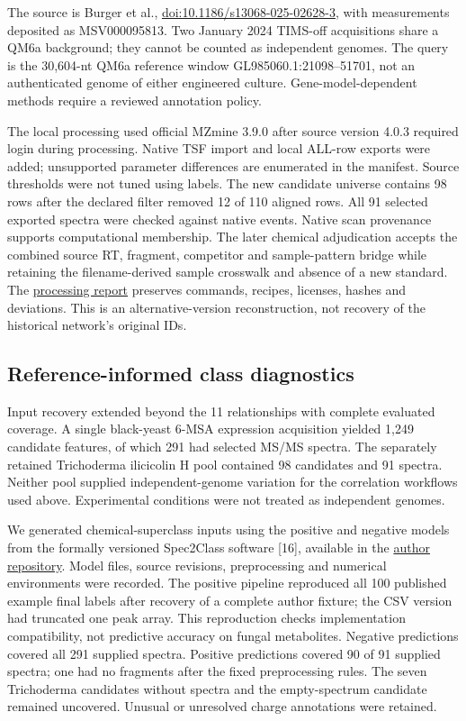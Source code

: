 \documentclass[
  10pt,
  a4paper,
]{article}
\begin{document}
The source is Burger et al., \href{https://doi.org/10.1186/s13068-025-02628-3}{doi:10.1186/s13068-025-02628-3}, with measurements deposited as MSV000095813. Two January 2024 TIMS-off acquisitions share a QM6a background; they cannot be counted as independent genomes. The query is the 30,604-nt QM6a reference window GL985060.1:21098--51701, not an authenticated genome of either engineered culture. Gene-model-dependent methods require a reviewed annotation policy.

The local processing used official MZmine 3.9.0 after source version 4.0.3 required login during processing. Native TSF import and local ALL-row exports were added; unsupported parameter differences are enumerated in the manifest. Source thresholds were not tuned using labels. The new candidate universe contains 98 rows after the declared filter removed 12 of 110 aligned rows. All 91 selected exported spectra were checked against native events. Native scan provenance supports computational membership. The later chemical adjudication accepts the combined source RT, fragment, competitor and sample-pattern bridge while retaining the filename-derived sample crosswalk and absence of a new standard. The \href{https://github.com/vinvomero/fungallink-benchmark/blob/main/docs/data/trichoderma-mzmine390-processing-2026-10-07.md}{processing report} preserves commands, recipes, licenses, hashes and deviations. This is an alternative-version reconstruction, not recovery of the historical network's original IDs.

\subsection{Reference-informed class diagnostics}\label{reference-informed-class-diagnostics}

Input recovery extended beyond the 11 relationships with complete evaluated coverage. A single black-yeast 6-MSA expression acquisition yielded 1,249 candidate features, of which 291 had selected MS/MS spectra. The separately retained Trichoderma ilicicolin H pool contained 98 candidates and 91 spectra. Neither pool supplied independent-genome variation for the correlation workflows used above. Experimental conditions were not treated as independent genomes.

We generated chemical-superclass inputs using the positive and negative models from the formally versioned Spec2Class software {[}16{]}, available in the \href{https://github.com/VickiPol/Spec2Class/tree/21c6f9433227c689d00549eae25e1fa2d4238fc3}{author repository}. Model files, source revisions, preprocessing and numerical environments were recorded. The positive pipeline reproduced all 100 published example final labels after recovery of a complete author fixture; the CSV version had truncated one peak array. This reproduction checks implementation compatibility, not predictive accuracy on fungal metabolites. Negative predictions covered all 291 supplied spectra. Positive predictions covered 90 of 91 supplied spectra; one had no fragments after the fixed preprocessing rules. The seven Trichoderma candidates without spectra and the empty-spectrum candidate remained uncovered. Unusual or unresolved charge annotations were retained.
\end{document}
